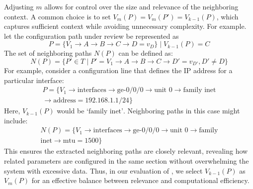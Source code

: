 Adjusting \( m \) allows for control over the size and relevance of the neighboring context.
A common choice is to set \(V_m(P) = V_m(P') = V_{k-1}(P) \), which captures sufficient context while avoiding unnecessary complexity. For example. let the configuration path under review be represented as
\[
P = \{V_1 \rightarrow A \rightarrow B \rightarrow C \rightarrow D = v_D \} \mid V_{k-1}(P) = C
\]
The set of neighboring paths \( N(P) \) can be defined as:
\[
N(P) = \{ P' \in T \mid P' = V_1 \rightarrow A \rightarrow B \rightarrow C \rightarrow D' = v_{D'}, D' \neq D \}
\]
For example, consider a configuration line that defines the IP address for a particular interface:
\begin{multline*}
P = \{V_1 \rightarrow \text{interfaces} \rightarrow \text{ge-0/0/0} 
\rightarrow \text{unit 0} \rightarrow \text{family inet}\\
\rightarrow \text{address} = 192.168.1.1/24 \}
\end{multline*}
Here, \(V_{k-1}(P)\) would be \( \text{`family inet'} \). Neighboring paths in this case might include:
\begin{multline*}
N(P) = \{V_1 \rightarrow \text{interfaces} \rightarrow \text{ge-0/0/0}
\rightarrow \text{unit 0} \rightarrow
\text{family}\\ \text{inet} \rightarrow \text{mtu} = 1500 \}
\end{multline*}
This ensures the extracted neighboring paths are closely relevant, revealing how related parameters are configured in the same section without overwhelming the system with excessive data. Thus, in our evaluation of \sysname{}, we select \(V_{k-1}(P)\) as  \( V_m(P) \) for an effective balance between relevance and computational efficiency.


